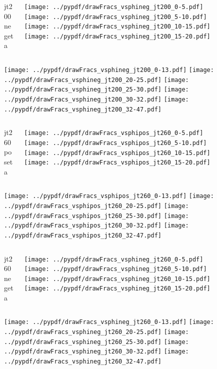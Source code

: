 \documentclass[aspectratio=169]{beamer}
\begin{document}
\begin{figure}[p]
\flushleft
\begin{columns}[T]
\begin{column}{.2\linewidth}
\centering
jt200 negeta
\end{column}
\begin{column}{.8\linewidth}
\texttt{[image: ../pypdf/drawFracs\_vsphineg\_jt200\_0-5.pdf]}
\texttt{[image: ../pypdf/drawFracs\_vsphineg\_jt200\_5-10.pdf]}
\texttt{[image: ../pypdf/drawFracs\_vsphineg\_jt200\_10-15.pdf]}
\texttt{[image: ../pypdf/drawFracs\_vsphineg\_jt200\_15-20.pdf]}
\end{column}
\end{columns}
\texttt{[image: ../pypdf/drawFracs\_vsphineg\_jt200\_0-13.pdf]}
\texttt{[image: ../pypdf/drawFracs\_vsphineg\_jt200\_20-25.pdf]}
\texttt{[image: ../pypdf/drawFracs\_vsphineg\_jt200\_25-30.pdf]}
\texttt{[image: ../pypdf/drawFracs\_vsphineg\_jt200\_30-32.pdf]}
\texttt{[image: ../pypdf/drawFracs\_vsphineg\_jt200\_32-47.pdf]}
\end{figure}

\begin{figure}[p]
\flushleft
\begin{columns}[T]
\begin{column}{.2\linewidth}
\centering
jt260 poseta
\end{column}
\begin{column}{.8\linewidth}
\texttt{[image: ../pypdf/drawFracs\_vsphipos\_jt260\_0-5.pdf]}
\texttt{[image: ../pypdf/drawFracs\_vsphipos\_jt260\_5-10.pdf]}
\texttt{[image: ../pypdf/drawFracs\_vsphipos\_jt260\_10-15.pdf]}
\texttt{[image: ../pypdf/drawFracs\_vsphipos\_jt260\_15-20.pdf]}
\end{column}
\end{columns}
\texttt{[image: ../pypdf/drawFracs\_vsphipos\_jt260\_0-13.pdf]}
\texttt{[image: ../pypdf/drawFracs\_vsphipos\_jt260\_20-25.pdf]}
\texttt{[image: ../pypdf/drawFracs\_vsphipos\_jt260\_25-30.pdf]}
\texttt{[image: ../pypdf/drawFracs\_vsphipos\_jt260\_30-32.pdf]}
\texttt{[image: ../pypdf/drawFracs\_vsphipos\_jt260\_32-47.pdf]}
\end{figure}


\begin{figure}[p]
\flushleft
\begin{columns}[T]
\begin{column}{.2\linewidth}
\centering
jt260 negeta
\end{column}
\begin{column}{.8\linewidth}
\texttt{[image: ../pypdf/drawFracs\_vsphineg\_jt260\_0-5.pdf]}
\texttt{[image: ../pypdf/drawFracs\_vsphineg\_jt260\_5-10.pdf]}
\texttt{[image: ../pypdf/drawFracs\_vsphineg\_jt260\_10-15.pdf]}
\texttt{[image: ../pypdf/drawFracs\_vsphineg\_jt260\_15-20.pdf]}
\end{column}
\end{columns}
\texttt{[image: ../pypdf/drawFracs\_vsphineg\_jt260\_0-13.pdf]}
\texttt{[image: ../pypdf/drawFracs\_vsphineg\_jt260\_20-25.pdf]}
\texttt{[image: ../pypdf/drawFracs\_vsphineg\_jt260\_25-30.pdf]}
\texttt{[image: ../pypdf/drawFracs\_vsphineg\_jt260\_30-32.pdf]}
\texttt{[image: ../pypdf/drawFracs\_vsphineg\_jt260\_32-47.pdf]}
\end{figure}
\end{document}
